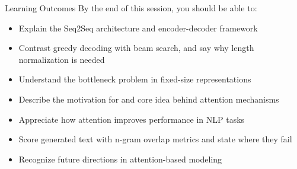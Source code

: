\begin{frame}{Learning Outcomes}
  By the end of this session, you should be able to:
  \begin{itemize}
    \item[\textcolor{red}{$\blacktriangleright$}] Explain the Seq2Seq architecture and encoder-decoder framework
    \item[\textcolor{red}{$\blacktriangleright$}] Contrast greedy decoding with beam search, and say why length normalization is needed
    \item[\textcolor{red}{$\blacktriangleright$}] Understand the bottleneck problem in fixed-size representations
    \item[\textcolor{red}{$\blacktriangleright$}] Describe the motivation for and core idea behind attention mechanisms
    \item[\textcolor{red}{$\blacktriangleright$}] Appreciate how attention improves performance in NLP tasks
    \item[\textcolor{red}{$\blacktriangleright$}] Score generated text with n-gram overlap metrics and state where they fail
    \item[\textcolor{red}{$\blacktriangleright$}] Recognize future directions in attention-based modeling
  \end{itemize}
\end{frame}
